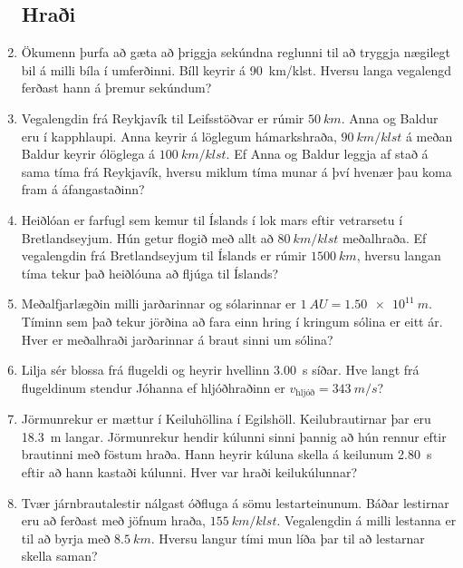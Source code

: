 \ifdefined \wholebook \else\documentclass[oneside]{book}\usepackage{EdlBook}\graphicspath{{figures/}}
\begin{document}
\begin{enumerate}[label = \textbf{Dæmi \thechapter.\arabic*.}]

\subsection*{Hraði}

\item Ökumenn þurfa að gæta að þriggja sekúndna reglunni til að tryggja nægilegt bil á milli bíla í umferðinni. Bíll keyrir á \SI{90}{km/klst}. Hversu langa vegalengd ferðast hann á þremur sekúndum?

\item Vegalengdin frá Reykjavík til Leifsstöðvar er rúmir $\SI{50}{km}$. Anna og Baldur eru í kapphlaupi. Anna keyrir á löglegum hámarkshraða, $\SI{90}{km/klst}$ á meðan Baldur keyrir ólöglega á $\SI{100}{km/klst}$. Ef Anna og Baldur leggja af stað á sama tíma frá Reykjavík, hversu miklum tíma munar á því hvenær þau koma fram á áfangastaðinn?

\item Heiðlóan er farfugl sem kemur til Íslands í lok mars eftir vetrarsetu í Bretlandseyjum. Hún getur flogið með allt að $\SI{80}{km/klst}$ meðalhraða. Ef vegalengdin frá Bretlandseyjum til Íslands er rúmir $\SI{1500}{km}$, hversu langan tíma tekur það heiðlóuna að fljúga til Íslands?

\item Meðalfjarlægðin milli jarðarinnar og sólarinnar er $\SI{1}{AU} = \SI{1.50e11}{m}$. Tíminn sem það tekur jörðina að fara einn hring í kringum sólina er eitt ár. Hver er meðalhraði jarðarinnar á braut sinni um sólina?

\item Lilja sér blossa frá flugeldi og heyrir hvellinn \SI{3.00}{s} síðar. Hve langt frá flugeldinum stendur Jóhanna ef hljóðhraðinn er $v_{\text{hljóð}} = \SI{343}{m/s}$?

\item Jörmunrekur er mættur í Keiluhöllina í Egilshöll. Keilubrautirnar þar eru \SI{18.3}{m} langar. Jörmunrekur hendir kúlunni sinni þannig að hún rennur eftir brautinni með föstum hraða. Hann heyrir kúluna skella á keilunum \SI{2.80}{s} eftir að hann kastaði kúlunni. Hver var hraði keilukúlunnar?

\item Tvær járnbrautalestir nálgast óðfluga á sömu lestarteinunum. Báðar lestirnar eru að ferðast með jöfnum hraða, $\SI{155}{km/klst}$. Vegalengdin á milli lestanna er til að byrja með $\SI{8.5}{km}$. Hversu langur tími mun líða þar til að lestarnar skella saman?  


\end{enumerate}
\end{document}
